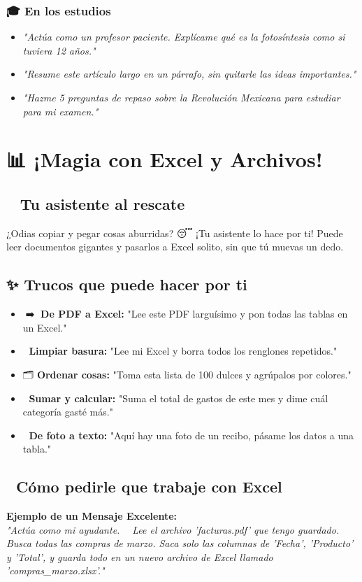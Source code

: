 \documentclass[12pt]{article}
\begin{document}
\subsubsection{🎓 En los estudios}
\begin{itemize}
    \item \textit{"Actúa como un profesor paciente. Explícame qué es la fotosíntesis como si tuviera 12 años."}
    \item \textit{"Resume este artículo largo en un párrafo, sin quitarle las ideas importantes."}
    \item \textit{"Hazme 5 preguntas de repaso sobre la Revolución Mexicana para estudiar para mi examen."}
\end{itemize}

\newpage
\section{📊 ¡Magia con Excel y Archivos!}

\subsection{🦸‍♂️ Tu asistente al rescate}
¿Odias copiar y pegar cosas aburridas? 😴 ¡Tu asistente lo hace por ti! Puede leer documentos gigantes y pasarlos a Excel solito, sin que tú muevas un dedo.

\subsection{✨ Trucos que puede hacer por ti}
\begin{itemize}
    \item 📄➡️📗 \textbf{De PDF a Excel:} "Lee este PDF larguísimo y pon todas las tablas en un Excel."
    \item 🧹 \textbf{Limpiar basura:} "Lee mi Excel y borra todos los renglones repetidos."
    \item 🗂️ \textbf{Ordenar cosas:} "Toma esta lista de 100 dulces y agrúpalos por colores."
    \item 🧮 \textbf{Sumar y calcular:} "Suma el total de gastos de este mes y dime cuál categoría gasté más."
    \item 📸 \textbf{De foto a texto:} "Aquí hay una foto de un recibo, pásame los datos a una tabla."
\end{itemize}

\subsection{📝 Cómo pedirle que trabaje con Excel}
\textbf{Ejemplo de un Mensaje Excelente:}\\
\textit{"Actúa como mi ayudante. 🙋‍♂️ Lee el archivo 'facturas.pdf' que tengo guardado. Busca todas las compras de marzo. Saca solo las columnas de 'Fecha', 'Producto' y 'Total', y guarda todo en un nuevo archivo de Excel llamado 'compras\_marzo.xlsx'."} 📂
\end{document}

